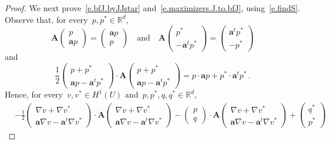 \documentclass[11pt,twoside]{article} %
\numberwithin{equation}{section}
\theoremstyle{definition}
\newcommand*{\Rd}{\ensuremath{\mathbb{R}^d}}
\newcommand{\qand}{\quad \mbox{and} \quad }
\renewcommand{\a}{\mathbf{a}}
\newcommand{\bfA}{\mathbf{A}}
\begin{document}
\begin{proof}
We next prove~\eqref{e.bfJ.byJJstar} and~\eqref{e.maximizers.J.to.bfJ}, using~\eqref{e.findS}. 
Observe that, for every~$p,p^*\in\Rd$, 
\begin{equation}
\label{e.iden.AP}
\bfA \begin{pmatrix} p   \\ \a p \end{pmatrix}
=
\begin{pmatrix} \a p   \\  p    \end{pmatrix}
\qand
\bfA \begin{pmatrix} p^*  \\  - \a^t p^* \end{pmatrix}
=
\begin{pmatrix} \a^t p^*  \\  - p^* \end{pmatrix}
\end{equation}
and
\begin{equation}
\label{e.iden.eqadjeq}
\frac12  \begin{pmatrix} p + p^* \\ \a p  - \a^t p^* \end{pmatrix} \cdot \bfA \begin{pmatrix} p + p^*  \\ \a p - \a^t p^* \end{pmatrix}
=
p \cdot \a p  +p^* \cdot \a^t p^*
\,.
\end{equation}
Hence, for every~$v,v^*\in H^1(U)$ and~$p,p^*,q,q^*\in\Rd$, 
\begin{align}
\label{e.iden.PAP}
& 
{-}\frac12  \begin{pmatrix} \nabla v{+}\nabla v^*  
\\ \a\nabla v {-} \a^t\nabla v^*  \end{pmatrix} 
\!\cdot\!
\bfA 
\begin{pmatrix} \nabla v{+}\nabla v^*  \\ 
\a\nabla v {-} \a^t\nabla v^*  \end{pmatrix} 
\! - \!
\begin{pmatrix} p \\ q \end{pmatrix} 
\!\cdot\!
\bfA
\begin{pmatrix} \nabla v{+}\nabla v^*  \\ 
\a\nabla v {-} \a^t\nabla v^* \end{pmatrix}
\! + \!
\begin{pmatrix} q^* \\ p^* \end{pmatrix}

\end{align}
\end{proof}
\end{document}
